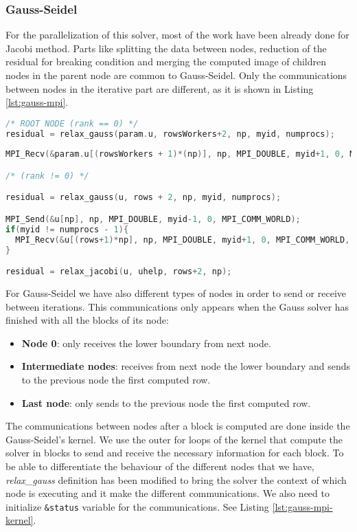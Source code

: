 \documentclass[a4paper, 10pt]{article}
\begin{document}
\subsubsection{Gauss-Seidel}

For the parallelization of this solver, most of the work have been already done for Jacobi method. Parts like splitting the data between nodes, reduction of the residual for breaking condition and merging the computed image of children nodes in the parent node are common to Gauss-Seidel. Only the communications between nodes in the iterative part are different, as it is shown in Listing \ref{lst:gauss-mpi}.

\begin{lstlisting}[language=c, caption={Communications between nodes Gauss-Seidel}, label={lst:gauss-mpi}]
/* ROOT NODE (rank == 0) */
residual = relax_gauss(param.u, rowsWorkers+2, np, myid, numprocs);
 
MPI_Recv(&param.u[(rowsWorkers + 1)*(np)], np, MPI_DOUBLE, myid+1, 0, MPI_COMM_WORLD, &status);

/* (rank != 0) */

residual = relax_gauss(u, rows + 2, np, myid, numprocs);   

MPI_Send(&u[np], np, MPI_DOUBLE, myid-1, 0, MPI_COMM_WORLD);
if(myid != numprocs - 1){
  MPI_Recv(&u[(rows+1)*np], np, MPI_DOUBLE, myid+1, 0, MPI_COMM_WORLD, &status);
}

residual = relax_jacobi(u, uhelp, rows+2, np);
\end{lstlisting}

For Gauss-Seidel we have also different types of nodes in order to send or receive between iterations. This communications only appears when the Gauss solver has finished with all the blocks of its node:

\begin{itemize}
  \item \textbf{Node 0}: only receives the lower boundary from next node.
  \item \textbf{Intermediate nodes}: receives from next node the lower boundary and sends to the previous node the first computed row.
  \item \textbf{Last node}: only sends to the previous node the first computed row.
\end{itemize}


The communications between nodes after a block is computed are done inside the Gauss-Seidel's kernel. We use the outer for loops of the kernel that compute the solver in blocks to send and receive the necessary information for each block. To be able to differentiate the behaviour of the different nodes that we have, \textit{relax\_gauss} definition has been modified to bring the solver the context of which node is executing and it make the different communications. We also need to initialize \texttt{\&status} variable for the communications. See Listing \ref{lst:gauss-mpi-kernel}.
\end{document}
